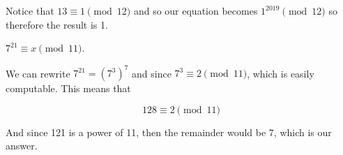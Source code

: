\documentclass[11pt]{article}
\begin{document}
\begin{Parts}
\begin{solution}
  Notice that $13 \equiv 1 \pmod {12}$ and so our equation becomes $1^{2019} \pmod {12}$ so therefore the result is 1.
\end{solution}
\Part $7^{21} \equiv x \pmod{11}$.

\begin{solution}
  We can rewrite $7^{21} = \left(7^{3}\right)^7$ and since $7^3 \equiv 2 \pmod 11$, which is easily computable. This means that 

  \[ 128 \equiv 2 \pmod {11}\]

  And since 121 is a power of 11, then the remainder would be $7$, which is our answer.
\end{solution}

\end{Parts}
\pagebreak
{}
\end{document}

